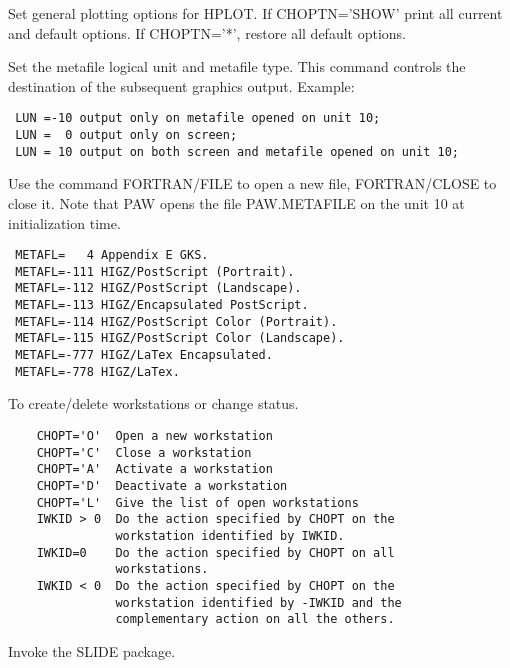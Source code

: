 \BEGARG
{}
\ENDARG
\BEGTEXT
Set general plotting options for HPLOT.
If CHOPTN='SHOW' print all current and default options.
If CHOPTN='*', restore all default options.
\ENDTEXT

\BEGARG
{}
\ENDARG
\BEGTEXT
Set the metafile logical unit and metafile type.
This command controls the destination of the subsequent graphics output.
Example:
\begin{verbatim}
 LUN =-10 output only on metafile opened on unit 10;
 LUN =  0 output only on screen;
 LUN = 10 output on both screen and metafile opened on unit 10;
\end{verbatim}
Use the command FORTRAN/FILE to open a new file, FORTRAN/CLOSE to close it.
Note that PAW opens the file PAW.METAFILE on the unit 10
at initialization time.
\begin{verbatim}
 METAFL=   4 Appendix E GKS.
 METAFL=-111 HIGZ/PostScript (Portrait).
 METAFL=-112 HIGZ/PostScript (Landscape).
 METAFL=-113 HIGZ/Encapsulated PostScript.
 METAFL=-114 HIGZ/PostScript Color (Portrait).
 METAFL=-115 HIGZ/PostScript Color (Landscape).
 METAFL=-777 HIGZ/LaTex Encapsulated.
 METAFL=-778 HIGZ/LaTex.
\end{verbatim}
\ENDTEXT

\BEGARG
{}
\ENDARG
\BEGTEXT
To create/delete workstations or change status.
\begin{verbatim}
    CHOPT='O'  Open a new workstation
    CHOPT='C'  Close a workstation
    CHOPT='A'  Activate a workstation
    CHOPT='D'  Deactivate a workstation
    CHOPT='L'  Give the list of open workstations
    IWKID > 0  Do the action specified by CHOPT on the
               workstation identified by IWKID.
    IWKID=0    Do the action specified by CHOPT on all
               workstations.
    IWKID < 0  Do the action specified by CHOPT on the
               workstation identified by -IWKID and the
               complementary action on all the others.
\end{verbatim}
\ENDTEXT

\BEGTEXT
Invoke the SLIDE package.
\ENDTEXT


